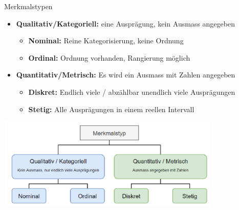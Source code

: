 \raggedcolumns

\begin{concept}{Merkmalstypen}
\begin{itemize}
    \item \textbf{Qualitativ/Kategoriell:} eine Ausprägung, kein Ausmass angegeben
    \begin{itemize}
        \item \textbf{Nominal:} Reine Kategorisierung, keine Ordnung 
        \item \textbf{Ordinal:} Ordnung vorhanden, Rangierung möglich
    \end{itemize}
    \item \textbf{Quantitativ/Metrisch:} Es wird ein Ausmass mit Zahlen angegeben
    \begin{itemize}
        \item \textbf{Diskret:} Endlich viele / abzählbar unendlich viele Ausprägungen
        \item \textbf{Stetig:} Alle Ausprägungen in einem reellen Intervall
    \end{itemize}
\end{itemize}

\begin{center}
    \includegraphics[width=0.8\textwidth]{images/merkmalstypen.png}
\end{center}
\end{concept}

